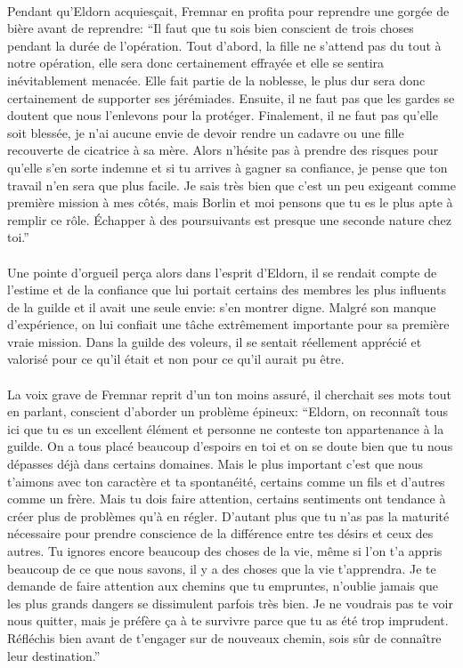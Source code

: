 \paragraph{}
Pendant qu'Eldorn acquiesçait, Fremnar en profita pour reprendre une gorgée de
bière avant de reprendre: ``Il faut que tu sois bien conscient de trois choses
pendant la durée de l'opération. Tout d'abord, la fille ne s'attend pas du
tout à notre opération, elle sera donc certainement effrayée et elle se
sentira inévitablement menacée. Elle fait partie de la noblesse, le plus dur
sera donc certainement de supporter ses jérémiades. Ensuite, il ne faut pas
que les gardes se doutent que nous l'enlevons pour la protéger. Finalement, il
ne faut pas qu'elle soit blessée, je n'ai aucune envie de devoir rendre un
cadavre ou une fille recouverte de cicatrice à sa mère. Alors n'hésite pas à
prendre des risques pour qu'elle s'en sorte indemne et si tu arrives à gagner
sa confiance, je pense que ton travail n'en sera que plus facile. Je sais très
bien que c'est un peu exigeant comme première mission à mes côtés, mais Borlin
et moi pensons que tu es le plus apte à remplir ce rôle. Échapper à des
poursuivants est presque une seconde nature chez toi.''

\paragraph{}
Une pointe d'orgueil perça alors dans l'esprit d'Eldorn, il se rendait compte
de l'estime et de la confiance que lui portait certains des membres les plus
influents de la guilde et il avait une seule envie: s'en montrer digne. Malgré
son manque d'expérience, on lui confiait une tâche extrêmement importante pour
sa première vraie mission. Dans la guilde des voleurs, il se sentait
réellement apprécié et valorisé pour ce qu'il était et non pour ce qu'il
aurait pu être.

\paragraph{}
La voix grave de Fremnar reprit d'un ton moins assuré, il cherchait ses mots
tout en parlant, conscient d'aborder un problème épineux: ``Eldorn, on
reconnaît tous ici que tu es un excellent élément et personne ne conteste ton
appartenance à la guilde. On a tous placé beaucoup d'espoirs en toi et on se
doute bien que tu nous dépasses déjà dans certains domaines. Mais le plus
important c'est que nous t'aimons avec ton caractère et ta spontanéité,
certains comme un fils et d'autres comme un frère. Mais tu dois faire
attention, certains sentiments ont tendance à créer plus de problèmes qu'à en
régler. D'autant plus que tu n'as pas la maturité nécessaire pour prendre
conscience de la différence entre tes désirs et ceux des autres. Tu ignores
encore beaucoup des choses de la vie, même si l'on t'a appris beaucoup de ce
que nous savons, il y a des choses que la vie t'apprendra. Je te demande de
faire attention aux chemins que tu empruntes, n'oublie jamais que les plus
grands dangers se dissimulent parfois très bien. Je ne voudrais pas te voir
nous quitter, mais je préfère ça à te survivre parce que tu as été trop
imprudent. Réfléchis bien avant de t'engager sur de nouveaux chemin, sois sûr
de connaître leur destination.''

